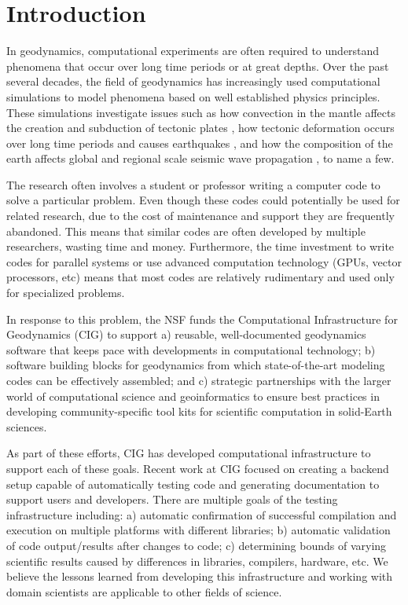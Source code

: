 \documentclass{acm_proc_article-sp}
\begin{document}
\section{Introduction}
In geodynamics, computational experiments are often required to understand phenomena that occur over long time periods or at great depths.  Over the past several decades, the field of geodynamics has increasingly used computational simulations to model phenomena based on well established physics principles.  These simulations investigate issues such as how convection in the mantle affects the creation and subduction of tectonic plates \cite{JGRB:JGRB12209}, how tectonic deformation occurs over long time periods and causes earthquakes \cite{Williams:2005vz}, and how the composition of the earth affects global and regional scale seismic wave propagation \cite{Komatitsch:1999ki}, to name a few.

The research often involves a student or professor writing a computer code to solve a particular problem.  Even though these codes could potentially be used for related research, due to the cost of maintenance and support they are frequently abandoned.  This means that similar codes are often developed by multiple researchers, wasting time and money.  Furthermore, the time investment to write codes for parallel systems or use advanced computation technology (GPUs, vector processors, etc) means that most codes are relatively rudimentary and used only for specialized problems.

In response to this problem, the NSF funds the Computational Infrastructure for Geodynamics (CIG) to support a) reusable, well-documented geodynamics software that keeps pace with developments in computational technology; b) software building blocks for geodynamics from which state-of-the-art modeling codes can be effectively assembled; and c) strategic partnerships with the larger world of computational science and geoinformatics to ensure best practices in developing community-specific tool kits for scientific computation in solid-Earth sciences.

As part of these efforts, CIG has developed computational infrastructure to support each of these goals.  Recent work at CIG focused on creating a backend setup capable of automatically testing code and generating documentation to support users and developers.  There are multiple goals of the testing infrastructure including: a) automatic confirmation of successful compilation and execution on multiple platforms with different libraries; b) automatic validation of code output/results after changes to code; c) determining bounds of varying scientific results caused by differences in libraries, compilers, hardware, etc.  We believe the lessons learned from developing this infrastructure and working with domain scientists are applicable to other fields of science.
\end{document}
